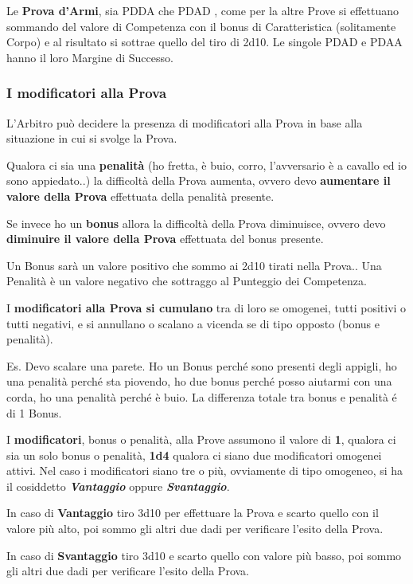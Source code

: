 \documentclass[12pt,a4paper,twoside,openany]{book}
\begin{document}
\begin{multicols}{2}
Le \textbf{Prova d'Armi}, sia PDDA che PDAD , come per la altre Prove si effettuano sommando del valore di Competenza con il bonus di Caratteristica (solitamente Corpo) e al risultato si sottrae quello del tiro di 2d10.
Le singole PDAD e PDAA hanno il loro Margine di Successo.

\subsubsection{I modificatori alla Prova}

L'Arbitro può decidere la presenza di modificatori alla Prova in base alla situazione in cui si svolge la Prova.

Qualora ci sia una \textbf{penalità} (ho fretta, è buio, corro, l'avversario è a cavallo ed io sono appiedato..) la difficoltà della Prova aumenta, ovvero devo \textbf{aumentare il valore della Prova} effettuata della penalità presente.

Se invece ho un \textbf{bonus} allora la difficoltà della Prova diminuisce, ovvero devo \textbf{diminuire il valore della Prova} effettuata del bonus presente.

Un Bonus sarà un valore positivo che sommo ai 2d10 tirati nella Prova.. Una Penalità è un valore negativo che sottraggo al Punteggio dei Competenza.

I \textbf{modificatori alla Prova si cumulano} tra di loro se omogenei, tutti positivi o tutti negativi, e si annullano o scalano a vicenda se di tipo opposto (bonus e penalità).

Es. Devo scalare una parete. Ho un Bonus perché sono presenti degli appigli, ho una penalità perché sta piovendo, ho due bonus perché posso aiutarmi con una corda, ho una penalità perché è buio. La differenza totale tra bonus e penalità é di 1 Bonus.

I \textbf{modificatori}, bonus o penalità, alla Prove assumono il valore di \textbf{1}, qualora ci sia un solo bonus o penalità, \textbf{1d4} qualora ci siano due modificatori omogenei attivi. Nel caso i modificatori siano tre o più, ovviamente di tipo omogeneo, si ha il cosiddetto \textbf{\textit{Vantaggio}} oppure \textbf{\textit{Svantaggio}}.

In caso di \textbf{Vantaggio} tiro 3d10 per effettuare la Prova e scarto quello con il valore più alto, poi sommo gli altri due dadi per verificare l'esito della Prova.

In caso di \textbf{Svantaggio} tiro 3d10 e scarto quello con valore più basso, poi sommo gli altri due dadi per verificare l'esito della Prova. 


\end{multicols}
\end{document}
